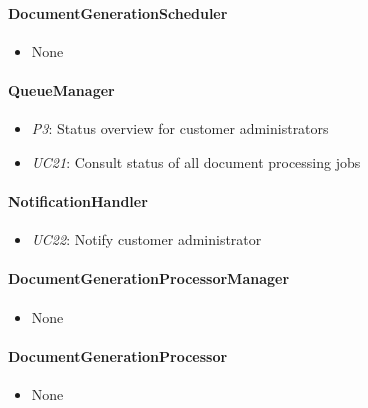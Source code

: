 \documentclass[a4paper,10pt]{article}
\begin{document}
\paragraph{DocumentGenerationScheduler}
\begin{itemize}
	\item None
\end{itemize}
\paragraph{QueueManager}
\begin{itemize}
	\item \emph{P3}: Status overview for customer administrators
	\item \emph{UC21}: Consult status of all document processing jobs
\end{itemize}
\paragraph{NotificationHandler}
\begin{itemize}
	\item \emph{UC22}: Notify customer administrator
\end{itemize}
\paragraph{DocumentGenerationProcessorManager}
\begin{itemize}
	\item None
\end{itemize}
\paragraph{DocumentGenerationProcessor}
\begin{itemize}
	\item None
\end{itemize}
\end{document}
